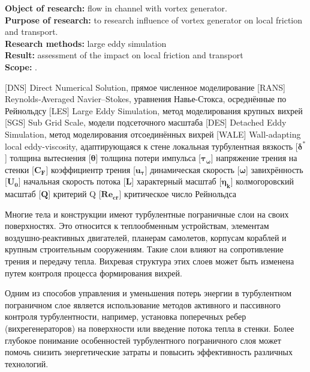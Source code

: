 \textbf{Object of research:} flow in channel with vortex generator.\\
\textbf{Purpose of research:} to research influence of vortex generator on local friction and transport.\\
\textbf{Research methods:} large eddy simulation\\
\textbf{Result:} assessment of the impact on local friction and transport\\
\textbf{Scope:} .\\
\newpage
{}
\begin{acronym}[RANS]
	   [DNS]   {Direct Numerical Solution, прямое численное моделирование}
	  [RANS]  {Reynolds-Averaged Navier–Stokes, уравнения Навье-Стокса, осреднённые по Рейнольдсу}
	   [LES]   {Large Eddy Simulation, метод моделирования крупных вихрей}
	   [SGS]   {Sub Grid Scale, модели подсеточного масштаба}
	   [DES]   {Detached Eddy Simulation, метод моделирования отсоединённых вихрей}
	  [WALE]  {Wall-adapting local eddy-viscosity, адаптирующаяся к стене локальная турбулентная вязкость}
	 [$\boldsymbol{\delta^*}$] {толщина вытеснения}
	 [$\boldsymbol{\theta}$] {толщина потери импульса}
	 [$\boldsymbol{\tau_\omega}$] {напряжение трения на стенки}
	 [$\boldsymbol{C_F}$] {коэффициентр трения}
	 [$\boldsymbol{u_\tau}$] {динамическая скорость}
	 [$\boldsymbol{\omega}$] {завихрённость}
	 [$\boldsymbol{U_0}$] {начальная скорость потока}
	  [$\boldsymbol{L}$] {характерный масштаб}
	 [$\boldsymbol{\eta_k}$] {колмогоровский масштаб}
	 [$\boldsymbol{Q}$] {критерий Q}
	 [$\boldsymbol{Re_{cr}}$] {критическое число Рейнольдса}
\end{acronym}
\newpage
{}
	
	‍Многие тела и конструкции имеют турбулентные пограничные слои на своих поверхностях. Это относится к теплообменным устройствам, элементам воздушно-реактивных двигателей, планерам самолетов, корпусам кораблей и крупным строительным сооружениям. Такие слои влияют на сопротивление трения и передачу тепла. Вихревая структура этих слоев может быть изменена путем контроля процесса формирования вихрей.
	
	Одним из способов управления и уменьшения потерь энергии в турбулентном пограничном слое является использование методов активного и пассивного контроля турбулентности, например, установка поперечных ребер (вихрегенераторов) на поверхности или введение потока тепла в стенки. Более глубокое понимание особенностей турбулентного пограничного слоя может помочь снизить энергетические затраты и повысить эффективность различных технологий.
	
